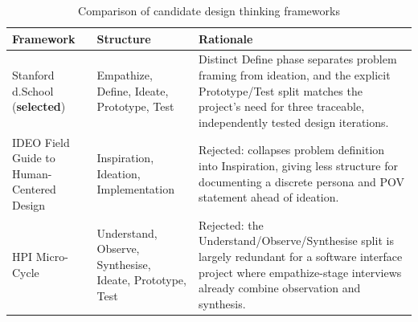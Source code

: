 \documentclass[11pt]{article}
\begin{document}
\begin{table}[H]
\centering
\caption{Comparison of candidate design thinking frameworks}
\label{tab:framework_comparison}
\small
\begin{tabular}{p{3cm}p{6cm}p{6cm}}
\hline
\textbf{Framework} & \textbf{Structure} & \textbf{Rationale} \\
\hline
Stanford d.School (\textbf{selected}) & Empathize, Define, Ideate, Prototype, Test & Distinct Define phase separates problem framing from ideation, and the explicit Prototype/Test split matches the project's need for three traceable, independently tested design iterations. \\
IDEO Field Guide to Human-Centered Design & Inspiration, Ideation, Implementation & Rejected: collapses problem definition into Inspiration, giving less structure for documenting a discrete persona and POV statement ahead of ideation. \\
HPI Micro-Cycle & Understand, Observe, Synthesise, Ideate, Prototype, Test & Rejected: the Understand/Observe/Synthesise split is largely redundant for a software interface project where empathize-stage interviews already combine observation and synthesis. \\
\hline
\end{tabular}
\end{table}
\end{document}
